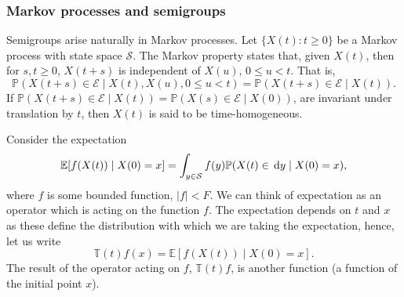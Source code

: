 \subsubsection{Markov processes and semigroups}
Semigroups arise naturally in Markov processes. Let \(\{X(t):t\geq 0\}\) be a Markov process with state space \(\mathcal S\). The Markov property states that, given \(X(t)\), then for \(s,t\geq 0\), \(X(t+s)\) is independent of \(X(u),\, 0\leq u<t\). That is, \[\mathbb P(X(t+s)\in\mathcal{E} \mid X(t), X(u), 0\leq u<t)=\mathbb P(X(t+s)\in\mathcal{E} \mid X(t)).\] 
If \(\mathbb P(X(t+s)\in\mathcal{E} \mid X(t))=\mathbb P(X(s)\in\mathcal{E} \mid X(0))\), are invariant under translation by \(t\), then \(X(t)\) is said to be time-homogeneous.


 
Consider the expectation
\[\mathbb E[f(X(t))\mid X(0)=x]=\int_{y\in\mathcal{S}} f(y) \mathbb P(X(t)\in\, \mathrm{d} y\mid X(0)=x),\]
where \(f\) is some bounded function, \(|f|<F\). We can think of expectation as an operator which is acting on the function \(f\). The expectation depends on \(t\) and \(x\) as these define the distribution with which we are taking the expectation, hence, let us write 
\[\mathbb T(t)f(x) = \mathbb E[f(X(t))\mid X(0)=x].\]
The result of the operator acting on \(f\), \(\mathbb T(t)f\), is another function (a function of the initial point \(x\)).

